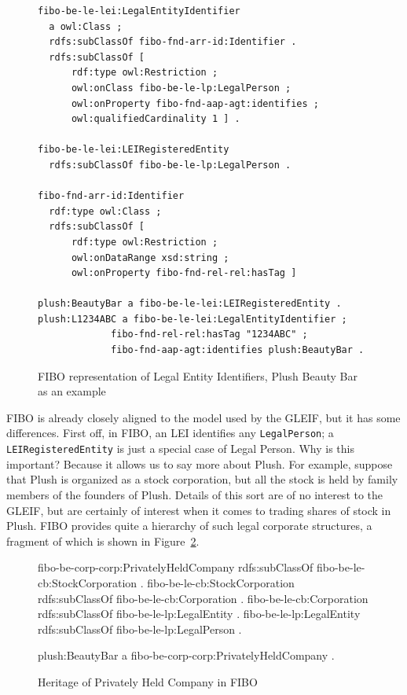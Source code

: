 \begin{figure}
\begin{lstlisting}
fibo-be-le-lei:LegalEntityIdentifier
  a owl:Class ;
  rdfs:subClassOf fibo-fnd-arr-id:Identifier .
  rdfs:subClassOf [
      rdf:type owl:Restriction ;
      owl:onClass fibo-be-le-lp:LegalPerson ;
      owl:onProperty fibo-fnd-aap-agt:identifies ;
      owl:qualifiedCardinality 1 ] .
   
fibo-be-le-lei:LEIRegisteredEntity
  rdfs:subClassOf fibo-be-le-lp:LegalPerson .   
  
fibo-fnd-arr-id:Identifier
  rdf:type owl:Class ;
  rdfs:subClassOf [
      rdf:type owl:Restriction ;
      owl:onDataRange xsd:string ;
      owl:onProperty fibo-fnd-rel-rel:hasTag ] 

plush:BeautyBar a fibo-be-le-lei:LEIRegisteredEntity .
plush:L1234ABC a fibo-be-le-lei:LegalEntityIdentifier ;
             fibo-fnd-rel-rel:hasTag "1234ABC" ;
             fibo-fnd-aap-agt:identifies plush:BeautyBar . 
\end{lstlisting}
    \caption{FIBO representation of Legal Entity Identifiers, Plush Beauty Bar as an example}
    \label{fig:ch14.fibolei}
\end{figure}

FIBO is already closely aligned to the model used by the GLEIF, but it has some differences.   First off, in FIBO, an LEI identifies 
any \texttt{LegalPerson}; a \texttt{LEIRegisteredEntity} is just a special case of Legal Person.  Why is this important?   Because it 
allows us to 
say more about Plush.  For example, suppose that Plush is organized as a stock corporation, but all the stock is held by family members of the 
founders of Plush.  Details of this sort are of no interest to the GLEIF, but are certainly of interest when it comes to trading shares of 
stock in Plush.  FIBO provides quite a hierarchy of such legal corporate structures, a fragment of which is shown in Figure~\ref{fig:ch14.fibocorp}.

\begin{figure}
fibo-be-corp-corp:PrivatelyHeldCompany
  rdfs:subClassOf fibo-be-le-cb:StockCorporation .
fibo-be-le-cb:StockCorporation
  rdfs:subClassOf fibo-be-le-cb:Corporation .
fibo-be-le-cb:Corporation
  rdfs:subClassOf fibo-be-le-lp:LegalEntity .
fibo-be-le-lp:LegalEntity
  rdfs:subClassOf fibo-be-le-lp:LegalPerson .
  
plush:BeautyBar a fibo-be-corp-corp:PrivatelyHeldCompany .

    \caption{Heritage of Privately Held Company in FIBO}
    \label{fig:ch14.fibocorp}
\end{figure}

